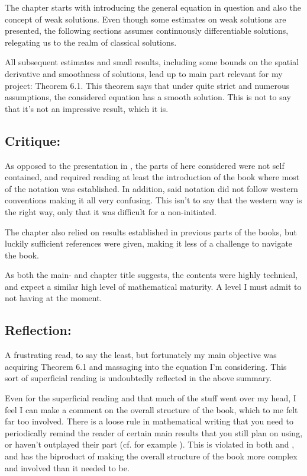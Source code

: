 \documentclass[11pt, a4paper]{article}
\begin{document}
The chapter starts with introducing the general equation in question and also the concept of weak solutions. Even though some estimates on weak solutions are presented, the following sections assumes continuously differentiable solutions, relegating us to the realm of classical solutions.

All subsequent estimates and small results, including some bounds on the spatial derivative  and smoothness of solutions, lead up to main part relevant for my project: Theorem 6.1. This theorem says that under quite strict and numerous assumptions, the considered equation has a smooth solution. This is not to say that it's not an impressive result, which it is.

\subsection{Critique:}
As opposed to the presentation in \cite{evans}, the parts of \cite{ladyzhenskaya} here considered were not self contained, and required reading at least the introduction of the book where most of the notation was established. In addition, said notation did not follow western conventions making it all very confusing. This isn't to say that the western way is the right way, only that it was difficult for a non-initiated.

The chapter also relied on results established in previous parts of the books, but luckily sufficient references were given, making it less of a challenge to navigate the book. 

As both the main- and chapter title suggests, the contents were highly technical, and expect a similar high level of mathematical maturity. A level I must admit to not having at the moment.

\subsection{Reflection:}
A frustrating read, to say the least, but fortunately my main objective was acquiring Theorem 6.1 and massaging into the equation I'm considering. This sort of superficial reading is undoubtedly reflected in the above summary.

Even for the superficial reading and that much of the stuff went over my head, I feel I can  make a comment on the overall structure of the book, which to me felt far too involved. There is a loose rule in mathematical writing that you need to periodically remind the reader of certain main results that you still plan on using, or haven't outplayed their part (cf. for example \cite{halmos1970write}). This is violated in both \cite{ladyzhenskaya} and \cite{vazquez2007porous}, and has the biproduct of making the overall structure of the book more complex and involved than it needed to be.
\end{document}
